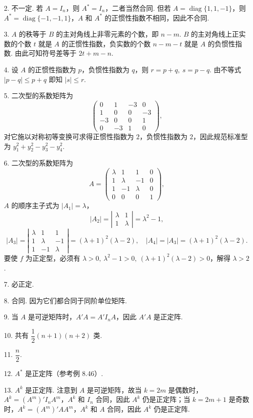 \documentclass[UTF8, 12pt, fontset=fandol, oneside]{ctexart}
\begin{document}
2. 不一定. 若 $A=I_n$，则 $A^*=I_n$，二者当然合同. 但若 $A=\operatorname{diag}\{1,1,-1\}$，则 $A^*=\operatorname{diag}\{-1,-1,1\}$，$A$ 和 $A^*$ 的正惯性指数不相同，因此不合同.

3. $A$ 的秩等于 $B$ 的主对角线上非零元素的个数，即 $n-m$. $B$ 的主对角线上正实数的个数 $t$ 就是 $A$ 的正惯性指数，负实数的个数 $n-m-t$ 就是 $A$ 的负惯性指数. 由此可知符号差等于 $2t+m-n$.

4. 设 $A$ 的正惯性指数为 $p$，负惯性指数为 $q$，则 $r=p+q,\ s=p-q$. 由不等式 $|p-q|\le p+q$ 即知 $|s|\le r$.

5. 二次型的系数矩阵为
\[
\left(\begin{array}{cccc}
0 & 1 & -3 & 0\\
1 & 0 & 0 & -3\\
-3 & 0 & 0 & 1\\
0 & -3 & 1 & 0
\end{array}\right),
\]
对它施以对称初等变换可求得正惯性指数为 $2$，负惯性指数为 $2$，因此规范标准型为 $y_1^2+y_2^2-y_3^2-y_4^2$.

6. 二次型的系数矩阵为
\[
A=\left(\begin{array}{cccc}
\lambda & 1 & 1 & 0\\
1 & \lambda & -1 & 0\\
1 & -1 & \lambda & 0\\
0 & 0 & 0 & 1
\end{array}\right),
\]
$A$ 的顺序主子式为 $|A_1|=\lambda$，
\[
|A_2|=\left|\begin{array}{cc}\lambda&1\\ 1&\lambda\end{array}\right|=\lambda^2-1,
\]
\[
|A_3|=\left|\begin{array}{ccc}\lambda&1&1\\ 1&\lambda&-1\\ 1&-1&\lambda\end{array}\right|=(\lambda+1)^2(\lambda-2),
\quad |A_4|=|A_3|=(\lambda+1)^2(\lambda-2).
\]
要使 $f$ 为正定型，必须有 $\lambda>0,\ \lambda^2-1>0,\ (\lambda+1)^2(\lambda-2)>0$，解得 $\lambda>2$.

7. 必正定.

8. 合同. 因为它们都合同于同阶单位矩阵.

9. 当 $A$ 是可逆矩阵时，$A'A=A'I_nA$，因此 $A'A$ 是正定阵.

10. 共有 $\dfrac12(n+1)(n+2)$ 类.

11. $\dfrac n2$.

12. $A^*$ 是正定阵（参考例 8.46）.

13. $A^k$ 是正定阵. 注意到 $A$ 是可逆矩阵，故当 $k=2m$ 是偶数时，$A^k=(A^m)'I_nA^m$，$A^k$ 和 $I_n$ 合同，因此 $A^k$ 仍是正定阵；当 $k=2m+1$ 是奇数时，$A^k=(A^m)'AA^m$，$A^k$ 和 $A$ 合同，因此 $A^k$ 仍是正定阵.
\end{document}
